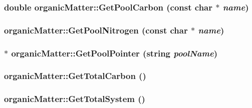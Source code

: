 \label{classorganic_matter_a719b504d46e267423e58c37d1c1bc058}
\hypertarget{classorganic_matter_ae4953f5b42a97f95201b293633a89e17}{
\subsubsection[{GetPoolCarbon}]{\setlength{\rightskip}{0pt plus 5cm}double organicMatter::GetPoolCarbon (const char $\ast$ {\em name})}}
\label{classorganic_matter_ae4953f5b42a97f95201b293633a89e17}
\hypertarget{classorganic_matter_a57c64ddc2f0aacaa27b4e2fb7e6c1713}{
\subsubsection[{GetPoolNitrogen}]{ organicMatter::GetPoolNitrogen (const char $\ast$ {\em name})}}
\label{classorganic_matter_a57c64ddc2f0aacaa27b4e2fb7e6c1713}
\hypertarget{classorganic_matter_a1e25c88f7c63626ad89ee88973310171}{
\subsubsection[{GetPoolPointer}]{ $\ast$ organicMatter::GetPoolPointer (string {\em poolName})}}
\label{classorganic_matter_a1e25c88f7c63626ad89ee88973310171}
\hypertarget{classorganic_matter_ae19830c90a2f172ede6a81e778c98d32}{
\subsubsection[{GetTotalCarbon}]{ organicMatter::GetTotalCarbon ()}}
\label{classorganic_matter_ae19830c90a2f172ede6a81e778c98d32}
\hypertarget{classorganic_matter_a0796a73dd50dd9cf1d97bf8a5de3d3a4}{
\subsubsection[{GetTotalSystem}]{ organicMatter::GetTotalSystem ()}}

